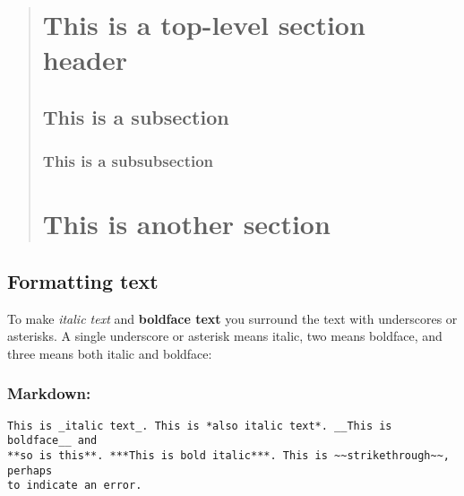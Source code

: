 \documentclass[
]{article}
\begin{document}
\begin{verbatim}
\end{verbatim}

\begin{quote}
\hypertarget{this-is-a-top-level-section-header}{%
\section{This is a top-level section
header}\label{this-is-a-top-level-section-header}}

\hypertarget{this-is-a-subsection}{%
\subsection{This is a subsection}\label{this-is-a-subsection}}

\hypertarget{this-is-a-subsubsection}{%
\subsubsection{This is a subsubsection}\label{this-is-a-subsubsection}}

\hypertarget{this-is-another-section}{%
\section{This is another section}\label{this-is-another-section}}
\end{quote}

\hypertarget{formatting-text}{%
\subsection{Formatting text}\label{formatting-text}}

To make \emph{italic text} and \textbf{boldface text} you surround the
text with underscores or asterisks. A single underscore or asterisk
means italic, two means boldface, and three means both italic and
boldface:

\hypertarget{markdown-3}{%
\subsubsection{Markdown:}\label{markdown-3}}

\begin{verbatim}
This is _italic text_. This is *also italic text*. __This is boldface__ and 
**so is this**. ***This is bold italic***. This is ~~strikethrough~~, perhaps 
to indicate an error.
\end{verbatim}
\end{document}
